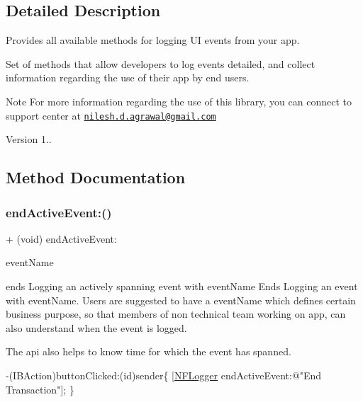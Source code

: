 \subsection{Detailed Description}
Provides all available methods for logging UI events from your app. 

Set of methods that allow developers to log events detailed, and collect information regarding the use of their app by end users.

\begin{DoxyNote}{Note}
For more information regarding the use of this library, you can connect to support center at \href{mailto:nilesh.d.agrawal@gmail.com}{\tt nilesh.\+d.\+agrawal@gmail.\+com}
\end{DoxyNote}
\begin{DoxyVersion}{Version}
1.. 
\end{DoxyVersion}


\subsection{Method Documentation}
\mbox{\label{interface_n_f_logger_a6cac38d011820ec21dc314c7a4d4aaf4}} 
\subsubsection{\texorpdfstring{end\+Active\+Event\+:()}{endActiveEvent:()}}
{\footnotesize\ttfamily + (void) end\+Active\+Event\+: \begin{DoxyParamCaption}\item[{(N\+S\+String $\ast$)}]{event\+Name }\end{DoxyParamCaption}}



ends Logging an actively spanning event with event\+Name Ends Logging an event with event\+Name. Users are suggested to have a event\+Name which defines certain business purpose, so that members of non technical team working on app, can also understand when the event is logged. 

The api also helps to know time for which the event has spanned.


\begin{DoxyCode}
-(IBAction)buttonClicked:(\textcolor{keywordtype}{id})sender\{
 [\hyperlink{interface_n_f_logger}{NFLogger} endActiveEvent:\textcolor{stringliteral}{@"End Transaction"}];
\}
\end{DoxyCode}
 
